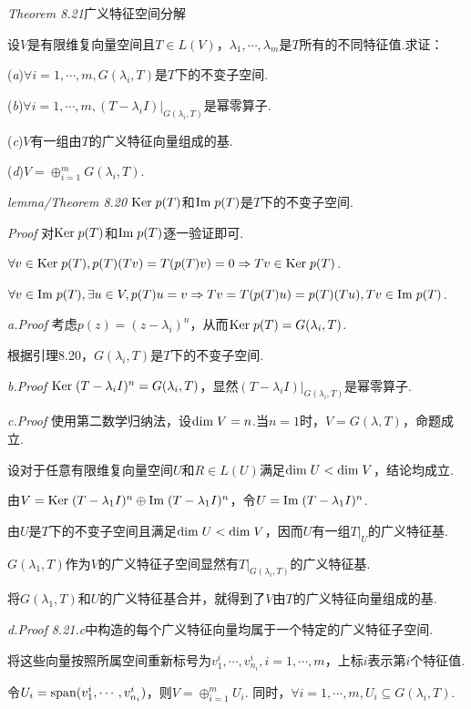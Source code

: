 \textit{Theorem 8.21}{\kaishu 广义特征空间分解}

设\(V\)是有限维复向量空间且\(T \in L(V)\)，\(\lambda_1,\cdots,\lambda_m\)是\(T\)所有的不同特征值.求证：

(\textit{a})\(\forall i=1,\cdots,m,G(\lambda_i,T)\)是\(T\)下的不变子空间.

(\textit{b})\(\forall i=1,\cdots,m,(T-\lambda_i I)|_{G(\lambda_i,T)}\)是幂零算子.

(\textit{c})\(V\)有一组由\(T\)的广义特征向量组成的基.

(\textit{d})\(V=\oplus_{i=1}^m G(\lambda_i,T)\).

\textit{lemma/Theorem 8.20}
\(\mathrm{Ker \;} p(T)\)和\(\mathrm{Im \;} p(T)\)是\(T\)下的不变子空间.

\textit{Proof}
对\(\mathrm{Ker \;} p(T)\)和\(\mathrm{Im \;} p(T)\)逐一验证即可.

\(\forall v \in \mathrm{Ker \;} p(T),p(T)(Tv)=T(p(T)v)=0 \Rightarrow Tv \in \mathrm{Ker \;} p(T)\).

\(\forall v \in \mathrm{Im \;} p(T),\exists u \in V,p(T)u=v \Rightarrow Tv=T(p(T)u)=p(T)(Tu),Tv \in \mathrm{Im \;} p(T)\).

\textit{a.Proof}
考虑\(p(z)=(z-\lambda_i)^n\)，从而\(\mathrm{Ker \;} p(T)=G(\lambda_i,T)\).

根据引理8.20，\(G(\lambda_i,T)\)是\(T\)下的不变子空间.

\textit{b.Proof}
\(\mathrm{Ker \;} (T-\lambda_i I)^n=G(\lambda_i,T)\)，显然\((T-\lambda_i I)|_{G(\lambda_i,T)}\)是幂零算子.

\textit{c.Proof}
使用第二数学归纳法，设\(\mathrm{dim \;} V=n\).当\(n=1\)时，\(V=G(\lambda,T)\)，命题成立.

设对于任意有限维复向量空间\(U\)和\(R \in L(U)\)满足\(\mathrm{dim \;} U<\mathrm{dim \;} V\)，结论均成立.

由\(V=\mathrm{Ker \;} (T-\lambda_1 I)^n \oplus \mathrm{Im \;} (T-\lambda_1 I)^n\)，令\(U=\mathrm{Im \;} (T-\lambda_1 I)^n\).

由\(U\)是\(T\)下的不变子空间且满足\(\mathrm{dim \;} U<\mathrm{dim \;} V\)，因而\(U\)有一组\(T|_U\)的广义特征基.

\(G(\lambda_1,T)\)作为\(V\)的广义特征子空间显然有\(T|_{G(\lambda_i,T)}\)的广义特征基.

将\(G(\lambda_1,T)\)和\(U\)的广义特征基合并，就得到了\(V\)由\(T\)的广义特征向量组成的基.

\textit{d.Proof}
\textit{8.21.c}中构造的每个广义特征向量均属于一个特定的广义特征子空间.

将这些向量按照所属空间重新标号为\(v_1^i,\cdots,v_{n_i}^i,i=1,\cdots,m\)，上标\(i\)表示第\(i\)个特征值.

令\(U_i=\mathrm{span}(v_1^i,\cdots,v_{n_i}^i)\)，则\(V=\oplus_{i=1}^m U_i\).
同时，\(\forall i=1,\cdots,m,U_i \subseteq G(\lambda_i,T)\).

